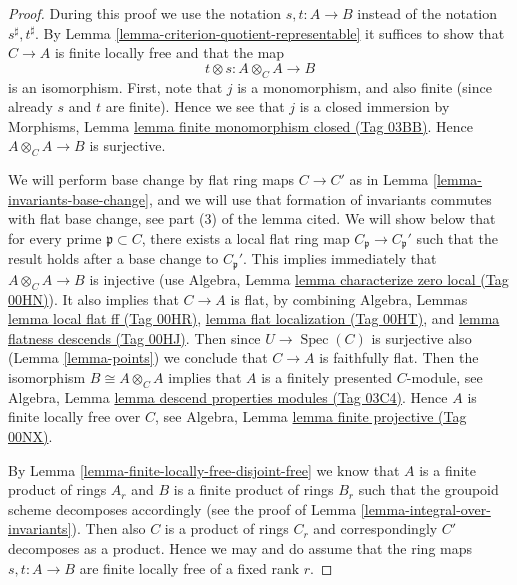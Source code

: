 \documentclass{amsart}
\theoremstyle{plain}
\theoremstyle{definition}
\theoremstyle{remark}
\numberwithin{equation}{subsection}
\def\Spec{\mathop{\mathrm{Spec}}}
\begin{document}
\begin{proof}
During this proof we use the notation $s, t : A \to B$
instead of the notation $s^\sharp, t^\sharp$.
By Lemma \ref{lemma-criterion-quotient-representable}
it suffices to show that $C \to A$ is finite locally free
and that the map
$$
t \otimes s : A \otimes_C A \longrightarrow B
$$
is an isomorphism. First, note that $j$ is a monomorphism, and
also finite (since already $s$ and $t$ are finite). Hence we see
that $j$ is a closed immersion by
Morphisms, Lemma \href{https://stacks.math.columbia.edu/tag/03BB}{lemma finite monomorphism closed (Tag 03BB)}.
Hence $A \otimes_C A \to B$ is surjective.

\medskip\noindent
We will perform base change by flat ring maps $C \to C'$ as in
Lemma \ref{lemma-invariants-base-change}, and we will use that
formation of invariants commutes with flat base change, see
part (3) of the lemma cited.
We will show below that for every prime $\mathfrak p \subset C$, there exists
a local flat ring map $C_{\mathfrak p} \to C_{\mathfrak p}'$
such that the result holds after a base change to $C_{\mathfrak p}'$.
This implies immediately
that $A \otimes_C A \to B$ is injective (use
Algebra, Lemma \href{https://stacks.math.columbia.edu/tag/00HN}{lemma characterize zero local (Tag 00HN)}).
It also implies that $C \to A$ is flat, by combining
Algebra, Lemmas \href{https://stacks.math.columbia.edu/tag/00HR}{lemma local flat ff (Tag 00HR)},
\href{https://stacks.math.columbia.edu/tag/00HT}{lemma flat localization (Tag 00HT)}, and
\href{https://stacks.math.columbia.edu/tag/00HJ}{lemma flatness descends (Tag 00HJ)}. Then since $U \to \Spec(C)$
is surjective also (Lemma \ref{lemma-points}) we conclude that $C \to A$
is faithfully flat. Then the isomorphism $B \cong A \otimes_C A$
implies that $A$ is a finitely presented $C$-module, see
Algebra, Lemma \href{https://stacks.math.columbia.edu/tag/03C4}{lemma descend properties modules (Tag 03C4)}.
Hence $A$ is finite locally free over $C$, see
Algebra, Lemma \href{https://stacks.math.columbia.edu/tag/00NX}{lemma finite projective (Tag 00NX)}.

\medskip\noindent
By Lemma \ref{lemma-finite-locally-free-disjoint-free}
we know that $A$ is a finite
product of rings $A_r$ and $B$ is a finite product of rings $B_r$
such that the groupoid scheme decomposes accordingly (see the proof
of Lemma \ref{lemma-integral-over-invariants}).
Then also $C$ is a product of rings $C_r$ and
correspondingly $C'$ decomposes as a product. Hence we may and do
assume that the ring maps $s, t : A \to B$ are finite
locally free of a fixed rank $r$.


\end{proof}
\end{document}

